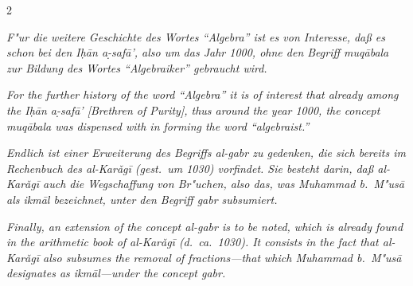 \documentclass[10pt,a4paper]{article}
\newcommand{\s}[1]{\d{#1}}
\newcommand{\hw}{\d{h}}
\newcommand{\enquote}[1]{``#1''}
\begin{document}
\begin{paracol}{2}
\switchcolumn*

\textit{F"ur die weitere Geschichte des Wortes \enquote{Algebra} ist es von Interesse, da\ss{} es schon bei den I\hw{}\=an a\s-s{}af\=a', also um das Jahr 1000, ohne den Begriff \textit{muq\=abala} zur Bildung des Wortes \enquote{Algebraiker} gebraucht wird.}

\switchcolumn

\textit{For the further history of the word \enquote{Algebra} it is of interest that already among the I\hw{}\=an a\s-s{}af\=a' [Brethren of Purity], thus around the year 1000, the concept \textit{muq\=abala} was dispensed with in forming the word \enquote{algebraist.}}

\switchcolumn*

\textit{Endlich ist einer Erweiterung des Begriffs \textit{al-gabr} zu gedenken, die sich bereits im Rechenbuch des al-Kar\v{a}g\=i{} (gest.\ um 1030) vorfindet. Sie besteht darin, da\ss{} al-Kar\v{a}g\=i{} auch die Wegschaffung von Br"uchen, also das, was Muhammad b.\ M"us\=a als \textit{ikm\=al} bezeichnet, unter den Begriff \textit{gabr} subsumiert.}

\switchcolumn

\textit{Finally, an extension of the concept \textit{al-gabr} is to be noted, which is already found in the arithmetic book of al-Kar\v{a}g\=i{} (d.\ ca.\ 1030). It consists in the fact that al-Kar\v{a}g\=i{} also subsumes the removal of fractions---that which Muhammad b.\ M"us\=a designates as \textit{ikm\=al}---under the concept \textit{gabr}.}

\end{paracol}

\clearpage
\end{document}
